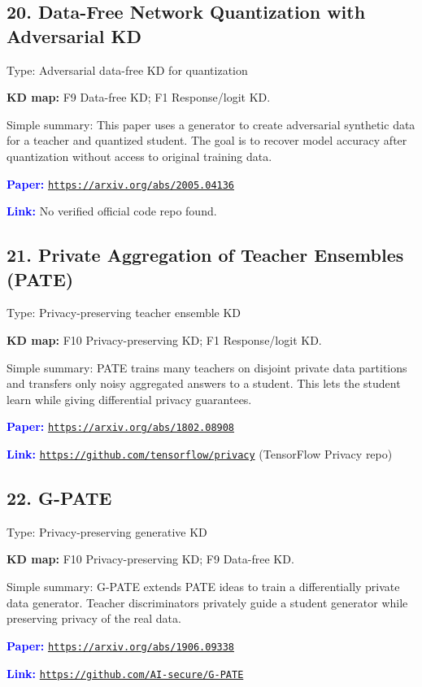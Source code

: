 \documentclass[10pt]{article}
\begin{document}
\subsection*{20. Data-Free Network Quantization with Adversarial KD}
Type: Adversarial data-free KD for quantization\par
\textbf{KD map:} F9 Data-free KD; F1 Response/logit KD.\par
Simple summary: This paper uses a generator to create adversarial synthetic data for a teacher and quantized student. The goal is to recover model accuracy after quantization without access to original training data.\par
\textcolor{blue}{\textbf{Paper:}} \href{https://arxiv.org/abs/2005.04136}{\nolinkurl{https://arxiv.org/abs/2005.04136}}\par
\textcolor{blue}{\textbf{Link:}} No verified official code repo found.\par

\subsection*{21. Private Aggregation of Teacher Ensembles (PATE)}
Type: Privacy-preserving teacher ensemble KD\par
\textbf{KD map:} F10 Privacy-preserving KD; F1 Response/logit KD.\par
Simple summary: PATE trains many teachers on disjoint private data partitions and transfers only noisy aggregated answers to a student. This lets the student learn while giving differential privacy guarantees.\par
\textcolor{blue}{\textbf{Paper:}} \href{https://arxiv.org/abs/1802.08908}{\nolinkurl{https://arxiv.org/abs/1802.08908}}\par
\textcolor{blue}{\textbf{Link:}} \href{https://github.com/tensorflow/privacy}{\nolinkurl{https://github.com/tensorflow/privacy}} (TensorFlow Privacy repo)\par

\subsection*{22. G-PATE}
Type: Privacy-preserving generative KD\par
\textbf{KD map:} F10 Privacy-preserving KD; F9 Data-free KD.\par
Simple summary: G-PATE extends PATE ideas to train a differentially private data generator. Teacher discriminators privately guide a student generator while preserving privacy of the real data.\par
\textcolor{blue}{\textbf{Paper:}} \href{https://arxiv.org/abs/1906.09338}{\nolinkurl{https://arxiv.org/abs/1906.09338}}\par
\textcolor{blue}{\textbf{Link:}} \href{https://github.com/AI-secure/G-PATE}{\nolinkurl{https://github.com/AI-secure/G-PATE}}\par
\end{document}
